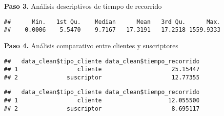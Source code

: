 \documentclass[
]{article}
\newenvironment{Shaded}{\begin{snugshade}}{\end{snugshade}}
\newcommand{\AttributeTok}[1]{\textcolor[rgb]{0.13,0.29,0.53}{#1}}
\newcommand{\FunctionTok}[1]{\textcolor[rgb]{0.13,0.29,0.53}{\textbf{#1}}}
\newcommand{\NormalTok}[1]{#1}
\newcommand{\SpecialCharTok}[1]{\textcolor[rgb]{0.81,0.36,0.00}{\textbf{#1}}}
\begin{document}
\hfill\break
\textbf{Paso 3.} Análisis descriptivos de tiempo de recorrido

\begin{Shaded}
\end{Shaded}

\begin{verbatim}
##      Min.   1st Qu.    Median      Mean   3rd Qu.      Max. 
##    0.0006    5.5470    9.7167   17.3191   17.2518 1559.9333
\end{verbatim}

\hfill\break
\textbf{Paso 4.} Análisis comparativo entre clientes y suscriptores

\begin{Shaded}
\end{Shaded}

\begin{verbatim}
##   data_clean$tipo_cliente data_clean$tiempo_recorrido
## 1                 cliente                    25.15447
## 2              suscriptor                    12.77355
\end{verbatim}

\begin{Shaded}
\end{Shaded}

\begin{verbatim}
##   data_clean$tipo_cliente data_clean$tiempo_recorrido
## 1                 cliente                   12.055500
## 2              suscriptor                    8.695117
\end{verbatim}

\begin{Shaded}
\end{Shaded}
\end{document}
